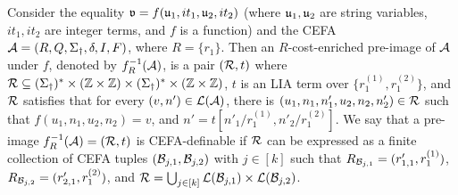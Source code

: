 {%
\begin{example}
	Consider the equality $\mathfrak{v} = f(\mathfrak{u}_1, it_1, \mathfrak{u}_2, it_2)$ (where $\mathfrak{u}_1,\mathfrak{u}_2$ are string variables, $it_1, it_2$ are integer terms, and $f$ is a function) and the CEFA $\mathcal{A} = (R, Q, \Sigma_{\dag}, \delta, I, F)$, where $R= \{r_1\}$. %
	Then an $R$-cost-enriched pre-image of $\mathcal{A}$ under $f$, denoted by $f^{-1}_{R}(\mathcal{A})$, is a pair $(\mathcal{R}, t)$ where $\mathcal{R} \subseteq (\Sigma_{\dag})^\ast \times (\mathbb{Z} \times \mathbb{Z}) \times (\Sigma_{\dag})^\ast \times (\mathbb{Z} \times \mathbb{Z})$, $t$ is an LIA term over $\{r^{(1)}_1, r^{(2)}_1\}$, and $\mathcal{R}$ satisfies that for every $(v, n') \in \mathcal{L}(\mathcal{A})$, there is $(u_1, n_1, n'_1, u_2, n_2, n'_2) \in \mathcal{R}$ such that $f(u_1, n_1, u_2, n_2) = v$, and  $n'= t[n'_1/r^{(1)}_1, n'_2/r^{(2)}_1]$. 
	We say that a pre-image $f^{-1}_{R}(\mathcal{A}) = (\mathcal{R}, t)$ is CEFA-definable if $\mathcal{R}$ can be expressed as a finite collection of CEFA tuples $(\mathcal{B}_{j, 1}, \mathcal{B}_{j, 2})$ with $j \in [k]$ such that $R_{\mathcal{B}_{j,1}}=(r'_{1,1}, r^{(1)}_1)$, $R_{\mathcal{B}_{j, 2}} = (r'_{2,1}, r^{(2)}_1)$, and $\mathcal{R} = \bigcup_{j \in [k]} \mathcal{L}(\mathcal{B}_{j, 1}) \times \mathcal{L}(\mathcal{B}_{j, 2})$.  

\end{example}}
